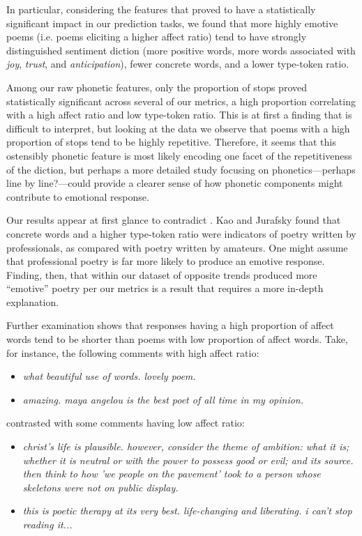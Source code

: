 \documentclass[11pt]{article}
\begin{document}
In particular, considering the features that proved to have a statistically significant impact in our prediction tasks, we found that more highly emotive poems (i.e. poems eliciting a higher affect ratio) tend to have strongly distinguished sentiment diction (more positive words, more words associated with \emph{joy}, \emph{trust}, and \emph{anticipation}), fewer concrete words, and a lower type-token ratio.

Among our raw phonetic features, only the proportion of stops proved statistically significant across several of our metrics, a high proportion correlating with a high affect ratio and low type-token ratio. This is at first a finding that is difficult to interpret, but looking at the data we observe that poems with a high proportion of stops tend to be highly repetitive. Therefore, it seems that this ostensibly phonetic feature is most likely encoding one facet of the repetitiveness of the diction, but perhaps a more detailed study focusing on phonetics---perhaps line by line?---could provide a clearer sense of how phonetic components might contribute to emotional response.

Our results appear at first glance to contradict . Kao and Jurafsky found that concrete words and a higher type-token ratio were indicators of poetry written by professionals, as compared with poetry written by amateurs. One might assume that professional poetry is far more likely to produce an emotive response. Finding, then, that within our dataset of opposite trends produced more ``emotive'' poetry per our metrics is a result that requires a more in-depth explanation.

Further examination shows that responses having a high proportion of affect words tend to be shorter than poems with low proportion of affect words. Take, for instance, the following comments with high affect ratio:

\begin{itemize}
\item \emph{what beautiful use of words. lovely poem.}
\item \emph{amazing. maya angelou is the best poet of all time in my opinion.}
\end{itemize}

contrasted with some comments having low affect ratio:

\begin{itemize}
\item \emph{christ's life is plausible. however, consider the theme of ambition: what it is; whether it is neutral or with the power to possess good or evil; and its source. then think to how 'we people on the pavement' took to a person whose skeletons were not on public display.}
\item \emph{this is poetic therapy at its very best. life-changing and liberating. i can't stop reading it...}
\end{itemize}
\end{document}
